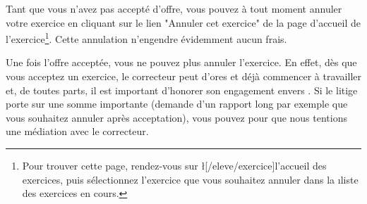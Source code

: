 ﻿Tant que vous n'avez pas accepté d'offre, vous pouvez à tout moment annuler votre exercice en cliquant sur le lien "Annuler cet exercice" de la page d'accueil de l'exercice\footnote{Pour trouver cette page, rendez-vous sur \l[/eleve/exercice]{l'accueil des exercices}, puis sélectionnez l'exercice que vous souhaitez annuler dans la \i{liste des exercices en cours}.}. Cette annulation n'engendre évidemment aucun frais.

Une fois l'offre acceptée, vous ne pouvez plus annuler l'exercice. En effet, dès que vous acceptez un exercice, le correcteur peut d'ores et déjà commencer à travailler et, de toutes parts, il est important d'honorer son engagement envers \eDevoir.
Si le litige porte sur une somme importante (demande d'un rapport long par exemple que vous souhaitez annuler après acceptation), vous pouvez  pour que nous tentions une médiation avec le correcteur.